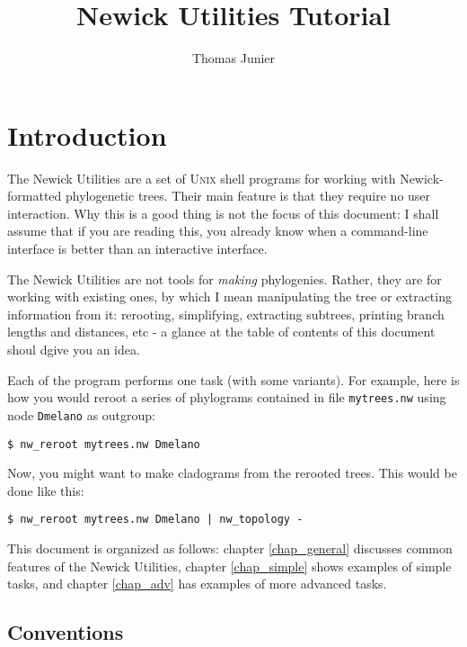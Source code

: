 \documentclass[a4paper,10pt]{report}
\title{Newick Utilities Tutorial}
\author{Thomas Junier}
\newcommand{\nutils}{Newick Utilities}
\newcommand{\unix}{\textsc{Unix}}
\begin{document}
\maketitle
\tableofcontents

\chapter{Introduction}

The \nutils{} are a set of \unix{} shell programs for working with Newick-formatted phylogenetic trees. Their main feature is that they require no user interaction. Why this is a good thing is not the focus of this document: I shall assume that if you are reading this, you already know when a command-line interface is better than an interactive interface.

The \nutils{} are not tools for \emph{making} phylogenies. Rather, they are for working with existing ones, by which I mean manipulating the tree or extracting information from it: rerooting, simplifying, extracting subtrees, printing branch lengths and distances, etc - a glance at the table of contents of this document shoul dgive you an idea.

Each of the program performs one task (with some variants). For example, here is how you would reroot a series of phylograms contained in file \texttt{mytrees.nw} using node \texttt{Dmelano} as outgroup:

\begin{verbatim}
$ nw_reroot mytrees.nw Dmelano
\end{verbatim} 
Now, you might want to make cladograms from the rerooted trees. This would be done like this:
\begin{verbatim}
$ nw_reroot mytrees.nw Dmelano | nw_topology -
\end{verbatim}

This document is organized as follows: chapter \ref{chap_general} discusses common features of the \nutils, chapter \ref{chap_simple} shows examples of simple tasks, and chapter \ref{chap_adv} has examples of more advanced tasks.

\section{Conventions}
\end{document}
